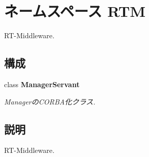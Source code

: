 \section{ネームスペース RTM}
\label{namespaceRTM}


RT-\/Middleware.  


\subsection*{構成}
\begin{DoxyCompactItemize}
\item 
class {\bf ManagerServant}
\begin{DoxyCompactList}\small\item\em ManagerのCORBA化クラス. \item\end{DoxyCompactList}\end{DoxyCompactItemize}


\subsection{説明}
RT-\/Middleware. 
